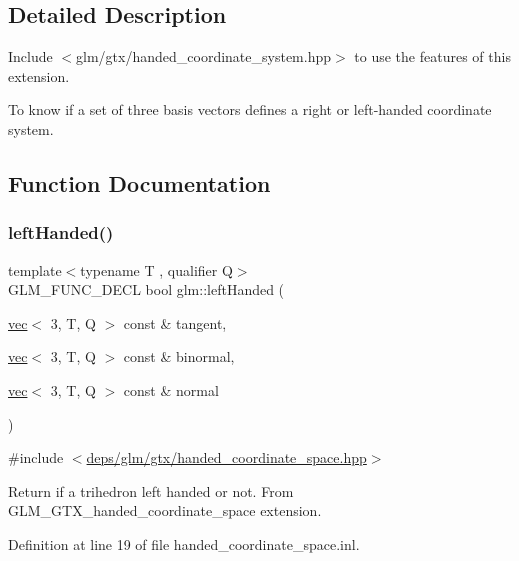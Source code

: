 \subsection{Detailed Description}
Include $<$glm/gtx/handed\+\_\+coordinate\+\_\+system.\+hpp$>$ to use the features of this extension.

To know if a set of three basis vectors defines a right or left-\/handed coordinate system. 

\subsection{Function Documentation}
\mbox{\label{group__gtx__handed__coordinate__space_ga6f1bad193b9a3b048543d1935cf04dd3}} 
\subsubsection{\texorpdfstring{left\+Handed()}{leftHanded()}}
{\footnotesize\ttfamily template$<$typename T , qualifier Q$>$ \\
G\+L\+M\+\_\+\+F\+U\+N\+C\+\_\+\+D\+E\+CL bool glm\+::left\+Handed (\begin{DoxyParamCaption}\item[{\hyperlink{structglm_1_1vec}{vec}$<$ 3, T, Q $>$ const \&}]{tangent,  }\item[{\hyperlink{structglm_1_1vec}{vec}$<$ 3, T, Q $>$ const \&}]{binormal,  }\item[{\hyperlink{structglm_1_1vec}{vec}$<$ 3, T, Q $>$ const \&}]{normal }\end{DoxyParamCaption})}



{\ttfamily \#include $<$\hyperlink{handed__coordinate__space_8hpp}{deps/glm/gtx/handed\+\_\+coordinate\+\_\+space.\+hpp}$>$}

Return if a trihedron left handed or not. From G\+L\+M\+\_\+\+G\+T\+X\+\_\+handed\+\_\+coordinate\+\_\+space extension. 

Definition at line 19 of file handed\+\_\+coordinate\+\_\+space.\+inl.

\mbox{\label{group__gtx__handed__coordinate__space_ga99386a5ab5491871b947076e21699cc8}} 
